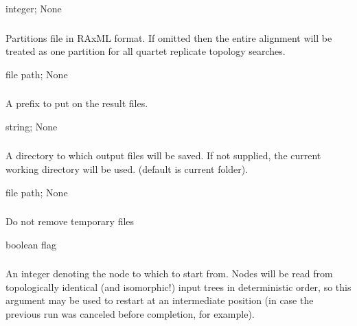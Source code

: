 \documentclass[letterpaper,12pt,english]{sphinxmanual}
\begin{document}
 integer;  None


\subsubsection{}
\label{\detokenize{prog_desc:partitions}}
 Partitions file in RAxML format. If omitted then the entire alignment will be treated as one partition for all quartet replicate topology searches.

 file path;  None


\subsubsection{}
\label{\detokenize{prog_desc:result-prefix}}
 A prefix to put on the result files.

 string;  None


\subsubsection{}
\label{\detokenize{prog_desc:results-dir}}
 A directory to which output files will be saved. If not supplied, the current working directory will be used. (default is current folder).

 file path;  None


\subsubsection{}
\label{\detokenize{prog_desc:retain-temp}}
 Do not remove temporary files

 boolean flag


\subsubsection{}
\label{\detokenize{prog_desc:start-node-number}}
 An integer denoting the node to which to start from. Nodes will be read from topologically identical (and isomorphic!) input trees in deterministic order, so this argument may be  used to restart at an intermediate position (in case the previous run was canceled before completion, for example).
\end{document}

